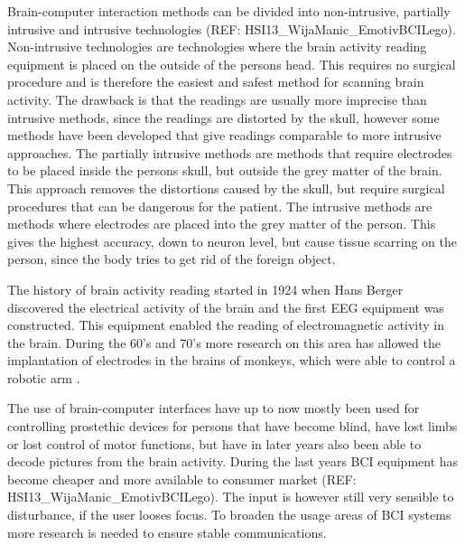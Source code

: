 Brain-computer interaction methods can be divided into non-intrusive, partially intrusive and intrusive technologies (REF: HSI13_WijaManic_EmotivBCILego). Non-intrusive technologies are technologies where the brain activity reading equipment is placed on the outside of the persons head. This requires no surgical procedure and is therefore the easiest and safest method for scanning brain activity. The drawback is that the readings are usually more imprecise than intrusive methods, since the readings are distorted by the skull, however some \cite{doud2011continuous} methods have been developed that give readings comparable to more intrusive approaches.
The partially intrusive methods are methods that require electrodes to be placed inside the persons skull, but outside the grey matter of the brain. This approach removes the distortions caused by the skull, but require surgical procedures that can be dangerous for the patient. The intrusive methods are methods where electrodes are placed into the grey matter of the person. This gives the highest accuracy, down to neuron level, but cause tissue scarring on the person, since the body tries to get rid of the foreign object.

The history of brain activity reading started in 1924 when Hans Berger discovered the electrical activity of the brain and the first EEG equipment was constructed. This equipment enabled the reading of electromagnetic activity in the brain. During the 60's and 70's more research on this area has allowed the implantation of electrodes in the brains of monkeys, which were able to control a robotic arm\cite{GeorgopoulosLuritoPetridesEtAl89}  .


The use of brain-computer interfaces have up to now mostly been used for controlling prostethic devices for persons that have become blind, have lost limbs or lost control of motor functions\cite{lebedev2006brain}, but have in later years also been able to decode pictures from the brain activity\cite{miyawaki2008visual}.
During the last years BCI equipment has become cheaper and more available to consumer market (REF: HSI13_WijaManic_EmotivBCILego). The input is however still very sensible to disturbance, if the user looses focus. To broaden the usage areas of BCI systems more research is needed to ensure stable communications.

